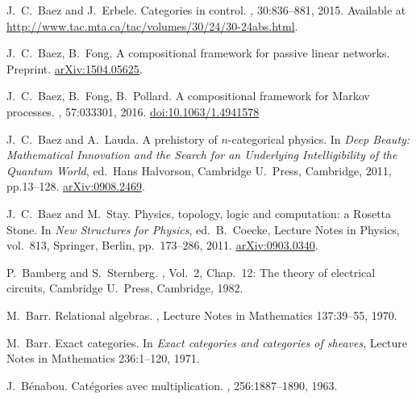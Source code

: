 \begin{thebibliography}{RSW00}
    J.\ C.\ Baez and J.\ Erbele.
    \newblock Categories in control. 
    , { 30}:836--881,
    2015. 
    \newblock Available at
    \href{http://www.tac.mta.ca/tac/volumes/30/24/30-24abs.html}{http://www.tac.mta.ca/tac/volumes/30/24/30-24abs.html}.

    J.\ C.\ Baez, B.\ Fong. 
    \newblock A compositional framework for passive linear networks.
    \newblock Preprint. 
    \newblock \href{http://arxiv.org/abs/1504.05625}{arXiv:1504.05625}. 

    J.\ C.\ Baez, B.\ Fong, B.\ Pollard. 
    \newblock A compositional framework for Markov processes.
    , 57:033301, 2016.  
    \newblock \href{http://dx.doi.org/10.1063/1.4941578}{doi:10.1063/1.4941578}

    J.\ C.\ Baez and A.\ Lauda.
    \newblock A prehistory of $n$-categorical
    physics. 
    \newblock In {\em Deep Beauty: Mathematical Innovation and
    the Search for an Underlying Intelligibility of the Quantum World}, ed.\
    Hans Halvorson, Cambridge U.\ Press, Cambridge, 2011, pp.13--128.  
    \newblock \href{http://arxiv.org/abs/0908.2469}{arXiv:0908.2469}.

    J.\ C.\ Baez and M.\ Stay. 
    \newblock Physics, topology, logic and 
    computation: a Rosetta Stone. 
    \newblock In {\sl New Structures for Physics}, ed.\ B.\ Coecke,  
    Lecture Notes in Physics, vol.\ 813, Springer, Berlin, pp.\ 173--286, 2011.
    \newblock \href{http://arxiv.org/abs/0903.0340}{arXiv:0903.0340}.

    P.\ Bamberg and S.\ Sternberg. 
    , Vol.\ 2, Chap.\ 12: The theory of electrical circuits,
    Cambridge U.\ Press, Cambridge, 1982. 
    
    M.\ Barr.
    \newblock Relational algebras.
    , Lecture Notes in
    Mathematics 137:39--55, 1970.

    M.\ Barr.
    \newblock Exact categories.
    \newblock In {\em Exact categories and categories of sheaves}, Lecture Notes in
    Mathematics 236:1--120, 1971.

    J.\ B\'enabou.
    \newblock Cat\'egories avec multiplication. 
    , 256:1887--1890, 1963.


\end{thebibliography}
